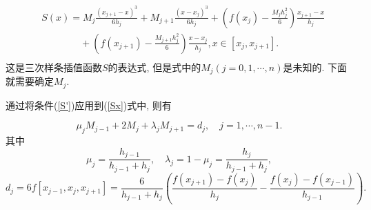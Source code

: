\documentclass[a4paper]{article}
\begin{document}
\begin{spacing}{1.5}
\begin{CJK*}{GBK}{song}
\begin{equation}\label{Sx}
\begin{split}
& S(x)=M_j\frac{(x_{j+1}-x)^3}{6h_j}+M_{j+1}\frac{(x-x_j)^3}{6h_j}+\left(f(x_j)-\frac{M_jh_j^2}{6}\right )\frac{x_{j+1}-x}{h_j} \\
& \quad \quad  \quad \quad   +\left(f(x_{j+1})-\frac{M_{j+1}h_j^2}{6}\right )\frac{x-x_j}{h_j}, x \in [x_j, x_{j+1}]. \\
\end{split}
\end{equation}
这是三次样条插值函数$S$的表达式, 但是式中的$M_j(j=0,1,\cdots, n)$是未知的. 下面就需要确定$M_j$.

通过将条件(\ref{S'})应用到(\ref{Sx})式中, 则有

\begin{equation}\label{lambda_mu}
\mu_jM_{j-1}+2M_j+\lambda_jM_{j+1}=d_j, \quad j=1,\cdots, n-1.
\end{equation}
其中
$$\mu_j=\frac{h_{j-1}}{h_{j-1}+h_j},\quad \lambda_j=1-\mu_j=\frac{h_j}{h_{j-1}+h_j},$$
$$ d_j=6f[x_{j-1}, x_j, x_{j+1}]=\frac{6}{h_{j-1}+h_j}\left( \frac{f(x_{j+1})-f(x_j)}{h_j} - \frac{f(x_j)-f(x_{j-1})}{h_{j-1}}\right).$$


\end{CJK*}
\end{spacing}
\end{document}
